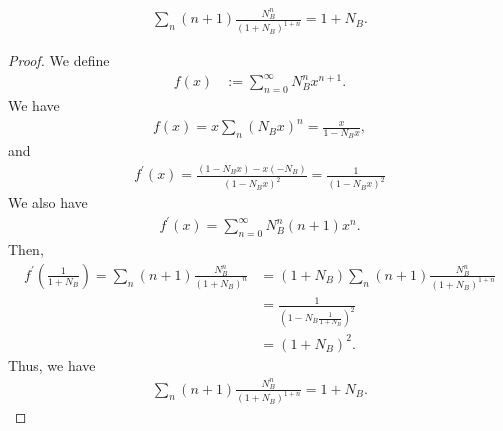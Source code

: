 \documentclass[../../note.tex]{subfiles}
\begin{document}
\begin{lemma}
\label{lemma: power series}
    \begin{align}
        \sum_{n} (n+1) \frac{N_B^n}{(1+N_B)^{1+n}} = 1 + N_B.
    \end{align}
\end{lemma}
\begin{proof}
    We define
    \begin{align}
        f(x)
        &:= \sum_{n=0}^{\infty} N_B^n x^{n+1}.
    \end{align}
    We have
    \begin{align}
        f(x) = x \sum_n (N_B x)^n = \frac{x}{1 - N_B x},
    \end{align}
    and 
    \begin{align}
        f^{\prime}(x) = \frac{(1-N_B x) - x (-N_B)}{(1 - N_B x)^2} = \frac{1}{(1-N_B x)^2}
    \end{align}
    We also have
    \begin{align}
        f^\prime(x) = \sum_{n=0}^{\infty} N_B^n (n+1) x^{n}.
    \end{align}
    Then, 
    \begin{align}
        f^{\prime}\left(\frac{1}{1+N_B}\right)
        = \sum_{n} (n+1) \frac{N_B^n}{(1+N_B)^n} 
        &=  (1+N_B) \sum_{n} (n+1) \frac{N_B^n}{(1+N_B)^{1+n}} \\
        &= \frac{1}{(1 - N_B \frac{1}{1+N_B})^2} \\
        &= (1 + N_B)^2.
    \end{align}
    Thus, we have
    \begin{align}
        \sum_{n} (n+1) \frac{N_B^n}{(1+N_B)^{1+n}} = 1 + N_B.
    \end{align}
\end{proof}
\end{document}
